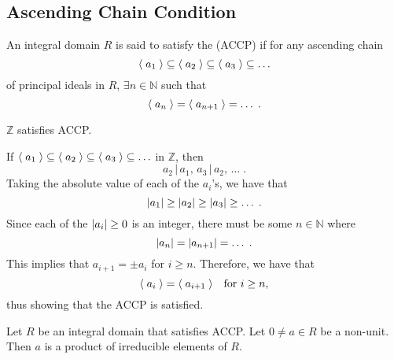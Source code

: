 \subsection{Ascending Chain Condition}%
\label{sub:ascending_chain_condition}

\begin{defn}
\label{defn:ascending_chain_condition_on_principal_ideals}
An integral domain $R$ is said to satisfy the  (ACCP) if for any ascending chain
\begin{equation*}
  \langle \; a_1 \; \rangle \subseteq \langle \; a_2 \; \rangle \subseteq \langle \; a_3 \; \rangle \subseteq \hdots
\end{equation*}
of principal ideals in $R$, $\exists n \in \mathbb{N}$ such that
\begin{equation*}
  \langle \; a_n \; \rangle = \langle \; a_{n + 1} \; \rangle = \hdots \; .
\end{equation*}
\end{defn}

\begin{eg}
  $\mathbb{Z}$ satisfies ACCP.

  If $\langle \; a_1 \; \rangle \subseteq \langle \; a_2 \; \rangle \subseteq \langle \; a_3 \; \rangle \subseteq \hdots$ in $\mathbb{Z}$, then
  \begin{equation*}
    a_2 \, | \, a_1, \, a_3 \, | \, a_2, \, \hdots \; .
  \end{equation*}
  Taking the absolute value of each of the $a_i$'s, we have that
  \begin{equation*}
    \left|a_1\right| \geq \left|a_2\right| \geq \left|a_3\right| \geq \hdots \; .
  \end{equation*}
  Since each of the $\left|a_i\right| \geq 0$ is an integer, there must be some $n \in \mathbb{N}$ where
  \begin{equation*}
    \left|a_n\right| = \left|a_{n + 1}\right| = \hdots \; .
  \end{equation*}
  This implies that $a_{i + 1} = \pm a_i$ for $i \geq n$. Therefore, we have that 
  \begin{equation*}
    \langle \; a_i \; \rangle = \langle \; a_{i + 1} \; \rangle \quad \text{for } i \geq n,
  \end{equation*}
  thus showing that the ACCP is satisfied.
\end{eg}

\begin{thm}
\label{thm:factorization_on_an_integral_domain_satisfying_accp}
  Let $R$ be an integral domain that satisfies ACCP. Let $0 \neq a \in R$ be a non-unit. Then $a$ is a product of irreducible elements of $R$.
\end{thm}

